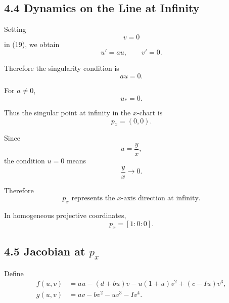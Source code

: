 \documentclass[11pt,a4paper]{article}
\begin{document}
\subsection{4.4 Dynamics on the Line at Infinity}

Setting
\begin{equation}
v=0
\end{equation}
in (19), we obtain
\begin{equation}
\boxed{
u'=au,
\qquad
v'=0.
}
\tag{20}
\end{equation}

Therefore the singularity condition is
\begin{equation}
au=0.
\end{equation}

For $a\neq0$,
\begin{equation}
\boxed{
u_*=0.
}
\tag{21}
\end{equation}

Thus the singular point at infinity in the $x$-chart is
\begin{equation}
\boxed{
p_x=(0,0).
}
\tag{22}
\end{equation}

Since
\begin{equation}
u=\frac{y}{x},
\end{equation}
the condition $u=0$ means
\begin{equation}
\frac{y}{x}\to0.
\end{equation}

Therefore
\begin{equation}
\boxed{
p_x\text{ represents the $x$-axis direction at infinity}.
}
\tag{23}
\end{equation}

In homogeneous projective coordinates,
\begin{equation}
\boxed{
p_x=[1:0:0].
}
\tag{24}
\end{equation}

\subsection{4.5 Jacobian at $p_x$}

Define
\begin{align}
f(u,v)
&=
au-(d+bu)v-u(1+u)v^2+(c-Iu)v^3,
\\
g(u,v)
&=
av-bv^2-uv^3-Iv^4.
\end{align}
\end{document}
